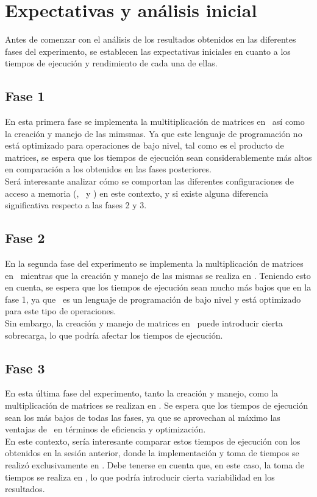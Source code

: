 \pagestyle{fancy}
\fancyhead[l]{\autorUO}
\fancyfoot[l]{\asignaturaAbbr}
\fancyfoot[r]{\fecha}

\section{Expectativas y análisis inicial} \label{sec:2}
Antes de comenzar con el análisis de los resultados obtenidos en las diferentes fases del experimento, se establecen 
las expectativas iniciales en cuanto a los tiempos de ejecución y rendimiento de cada una de ellas.

\subsection{Fase 1} \label{subsec:2.1}
En esta primera fase se implementa la multitiplicación de matrices en \python\, así como la creación y manejo de las mimsmas.
Ya que este lenguaje de programación no está optimizado para operaciones de bajo nivel, tal como es el producto 
de matrices, se espera que los tiempos de ejecución sean considerablemente más altos en comparación a los obtenidos 
en las fases posteriores. \\
Será interesante analizar cómo se comportan las diferentes configuraciones de acceso a memoria 
(\rowmajor, \colmajor\ y \zorder) en este contexto, y si existe alguna diferencia significativa respecto a las fases 
2 y 3.

\subsection{Fase 2} \label{subsec:2.2}
En la segunda fase del experimento se implementa la multiplicación de matrices en \C\, mientras que la creación y manejo de las mismas se
realiza en \python. Teniendo esto en cuenta, se espera que los tiempos de ejecución sean mucho más bajos que en la fase 1, 
ya que \C\ es un lenguaje de programación de bajo nivel y está optimizado para este tipo de operaciones. \\
Sin embargo, la creación y manejo de matrices en \python\ puede introducir cierta sobrecarga, lo que podría afectar
los tiempos de ejecución.

\subsection{Fase 3} \label{subsec:2.3}
En esta última fase del experimento, tanto la creación y manejo, como la multiplicación de matrices se realizan en \C.
Se espera que los tiempos de ejecución sean los más bajos de todas las fases, ya que se aprovechan al máximo las
ventajas de \C\ en términos de eficiencia y optimización. \\
En este contexto, sería interesante comparar estos tiempos de ejecución con los obtenidos en la sesión anterior, 
donde la implementación y toma de tiempos se realizó exclusivamente en \C. Debe tenerse en cuenta que, en este caso, 
la toma de tiempos se realiza en \python, lo que podría introducir cierta variabilidad en los resultados.





